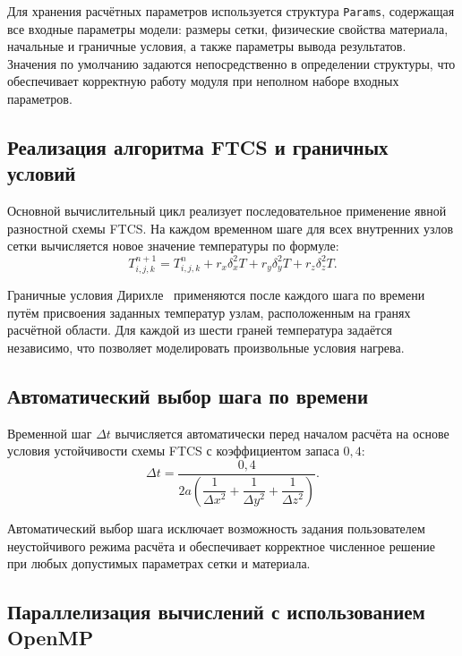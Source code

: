 Для хранения расчётных параметров используется структура \texttt{Params}, 
содержащая все входные параметры модели: размеры сетки, физические 
свойства материала, начальные и граничные условия, а также параметры 
вывода результатов. Значения по умолчанию задаются непосредственно 
в определении структуры, что обеспечивает корректную работу модуля 
при неполном наборе входных параметров.

\subsection{Реализация алгоритма FTCS и граничных условий}

Основной вычислительный цикл реализует последовательное применение 
явной разностной схемы FTCS. На каждом временном шаге для всех 
внутренних узлов сетки вычисляется новое значение температуры по 
формуле:
\begin{equation}
    T_{i,j,k}^{n+1} = T_{i,j,k}^{n} + 
    r_x \delta_x^2 T + 
    r_y \delta_y^2 T + 
    r_z \delta_z^2 T.
\end{equation}


Граничные условия Дирихле~\cite{дирихлерешении} применяются после каждого шага по времени 
путём присвоения заданных температур узлам, расположенным на гранях 
расчётной области. Для каждой из шести граней температура задаётся 
независимо, что позволяет моделировать произвольные условия нагрева.

\subsection{Автоматический выбор шага по времени}

Временной шаг $\Delta t$ вычисляется автоматически перед началом 
расчёта на основе условия устойчивости схемы FTCS с коэффициентом 
запаса $0{,}4$:
\begin{equation}
    \Delta t = \frac{0{,}4}{2a \left( 
    \dfrac{1}{\Delta x^2} + 
    \dfrac{1}{\Delta y^2} + 
    \dfrac{1}{\Delta z^2} \right)}.
\end{equation}

Автоматический выбор шага исключает возможность задания пользователем 
неустойчивого режима расчёта и обеспечивает корректное численное 
решение при любых допустимых параметрах сетки и материала.

\subsection{Параллелизация вычислений с использованием OpenMP}

